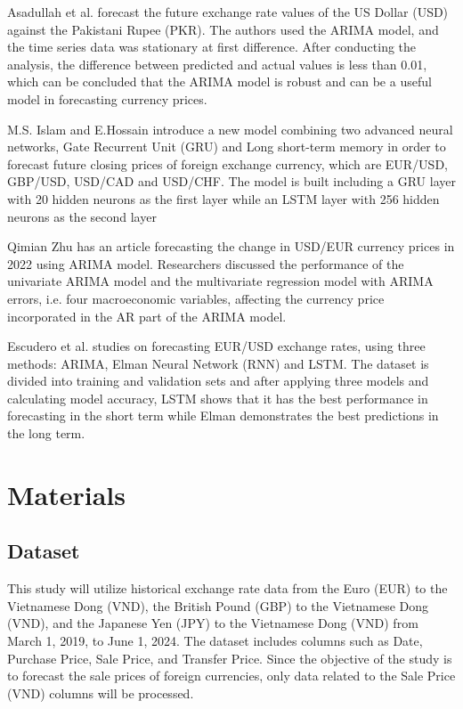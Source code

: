 \documentclass{ieeeojies}
\begin{document}
Asadullah et al. \cite{rw2} forecast the future exchange rate values of the US Dollar (USD) against the Pakistani Rupee (PKR). The authors used the ARIMA model, and the time series data was stationary at first difference. After conducting the analysis, the difference between predicted and actual values is less than 0.01, which can be concluded that the ARIMA model is robust and can be a useful model in forecasting currency prices.

M.S. Islam and E.Hossain \cite{rw3} introduce a new model combining two advanced neural networks, Gate Recurrent Unit (GRU) and Long short-term memory in order to forecast future closing prices of foreign exchange currency, which are EUR/USD, GBP/USD, USD/CAD and USD/CHF. The model is built including a GRU layer with 20 hidden neurons as the first layer while an LSTM layer with 256 hidden neurons as the second layer

Qimian Zhu \cite{rw4} has an article forecasting the change in USD/EUR currency prices in 2022 using ARIMA model. Researchers discussed the performance of the univariate ARIMA model and the multivariate regression model with ARIMA errors, i.e. four macroeconomic variables, affecting the currency price incorporated in the AR part of the ARIMA model.

Escudero et al. \cite{rw5} studies on forecasting EUR/USD exchange rates, using three methods: ARIMA, Elman Neural Network (RNN) and LSTM. The dataset is divided into training and validation sets and after applying three models and calculating model accuracy, LSTM shows that it has the best performance in forecasting in the short term while Elman demonstrates the best predictions in the long term.

\section{Materials}
\subsection{Dataset}
\justify
This study will utilize historical exchange rate data from the Euro (EUR) to the Vietnamese Dong (VND), the British Pound (GBP) to the Vietnamese Dong (VND), and the Japanese Yen (JPY) to the Vietnamese Dong (VND) from March 1, 2019, to June 1, 2024. The dataset includes columns such as Date, Purchase Price, Sale Price, and Transfer Price. Since the objective of the study is to forecast the sale prices of foreign currencies, only data related to the Sale Price (VND) columns will be processed.
\end{document}
